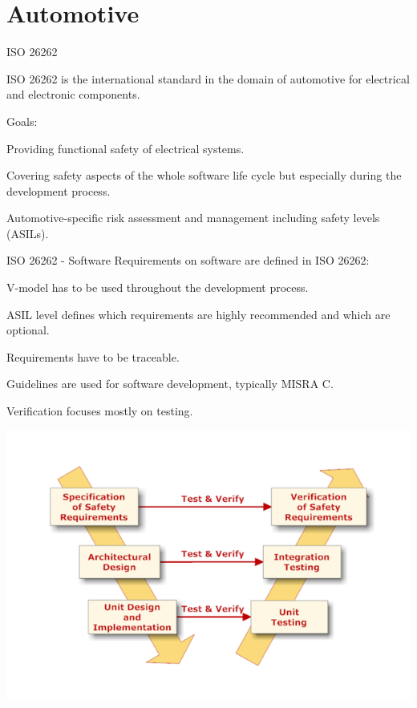 \section{Automotive}

\begin{frame}{ISO 26262}	
	\begin{block}{ISO 26262}
	is the international standard in the domain of automotive for electrical and electronic components.
	\end{block}
	\xxx
	Goals:
	\begin{beameritemize}
		\item Providing functional safety of electrical systems.
		\item Covering safety aspects of the whole software life cycle but especially during the development process.
		\item Automotive-specific risk assessment and management including safety levels (ASILs).
	\end{beameritemize}
\end{frame}


\begin{frame}{ISO 26262 - Software}	
	Requirements on software are defined in ISO 26262:
	
	\begin{beameritemize}
		\item V-model has to be used throughout the development process.
		\item ASIL level defines which requirements are highly recommended and which are optional.
		\item Requirements have to be traceable.
		\item Guidelines are used for software development, typically MISRA C.
		\item Verification focuses mostly on testing.
	\end{beameritemize}

\begin{center}
	\includegraphics[width=0.7\linewidth]{content/images/certification/iso26262vmodel}
\end{center}

\end{frame}

